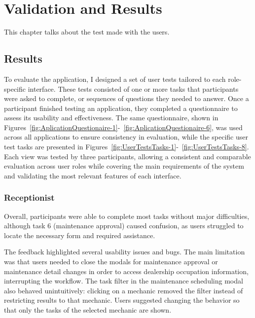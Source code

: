 \chapter{Validation and Results}%
\label{chapter:ValidationandResults}

\begin{introduction}
This chapter talks about the test made with the users.
\end{introduction} 


\section{Results}


To evaluate the application, I designed a set of user tests tailored to each role-specific interface. These tests consisted of one or more tasks that participants were asked to complete, or sequences of questions they needed to answer. Once a participant finished testing an application, they completed a questionnaire to assess its usability and effectiveness. The same questionnaire, shown in Figures~\ref{fig:AplicationQuestionaire-1}-~\ref{fig:AplicationQuestionaire-6}, was used across all applications to ensure consistency in evaluation, while the specific user test tasks are presented in Figures~\ref{fig:UserTestsTasks-1}-~\ref{fig:UserTestsTasks-8}. Each view was tested by three participants, allowing a consistent and comparable evaluation across user roles while covering the main requirements of the system and validating the most relevant features of each interface.

\subsection{Receptionist}
Overall, participants were able to complete most tasks without major difficulties, although task 6 (maintenance approval) caused confusion, as users struggled to locate the necessary form and required assistance.

The feedback highlighted several usability issues and bugs. The main limitation was that users needed to close the modals for maintenance approval or maintenance detail changes in order to access dealership occupation information, interrupting the workflow. The task filter in the maintenance scheduling modal also behaved unintuitively: clicking on a mechanic removed the filter instead of restricting results to that mechanic. Users suggested changing the behavior so that only the tasks of the selected mechanic are shown.

